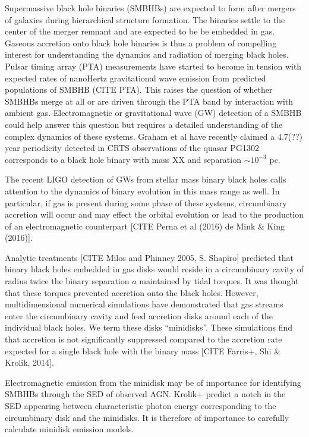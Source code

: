 \documentclass{emulateapj}
\begin{document}
Supermassive black hole binaries (SMBHBs) are expected to form after mergers of galaxies during hierarchical structure formation. The binaries settle to the center of the merger remnant and are expected to be be embedded in gas. Gaseous accretion onto black hole binaries is thus a problem of compelling interest for understanding the dynamics and radiation of merging black holes. Pulsar timing array (PTA) measurements have started to become in tension with expected rates of nanoHertz gravitational wave emission from predicted populations of SMBHB (CITE PTA). This raises the question of whether SMBHBs merge at all or are driven through the PTA band by interaction with ambient gas. Electromagnetic or gravitational wave (GW) detection of a SMBHB could help answer this question but requires a detailed understanding of the complex dynamics of these systems. Graham et al have recently claimed a 4.7(??) year periodicity detected in CRTS observations of the quasar PG1302 corresponds to a black hole binary with mass XX and separation $\sim 10^{-3}$ pc. 

The recent LIGO detection of GWs from stellar mass binary black holes calls attention to the dynamics of binary evolution in this mass range as well. In particular, if gas is present during some phase of these systems, circumbinary accretion will occur and may effect the orbital evolution or lead to the production of an electromagnetic counterpart [CITE Perna et al (2016) de Mink \& King (2016)].


Analytic treatments [CITE Milos and Phinney 2005, S. Shapiro] predicted that binary black holes embedded in gas disks would reside in a circumbinary cavity of radius twice the binary separation $a$ maintained by tidal torques. It was thought that these torques prevented accretion onto the black holes. However, multidimensional numerical simulations \citep{MacFadyen08, Noble12, DOrazio12, Farris14, Farris15A, Farris15B, DOrazio16} have demonstrated that gas streams enter the circumbinary cavity and feed accretion disks around each of the individual black holes. We term these disks ``minidisks''. These simulations find that accretion is not significantly suppressed compared to the accretion rate expected for a single black hole with the binary mass [CITE Farris+, Shi \& Krolik, 2014].

Electromagnetic emission from the minidisk may be of importance for identifying SMBHBs through the SED of observed AGN. Krolik+ predict a notch in the SED appearing between characteristic photon energy corresponding to the circumbinary disk and the minidisks. It is therefore of importance to carefully calculate minidisk emission models.
\end{document}
